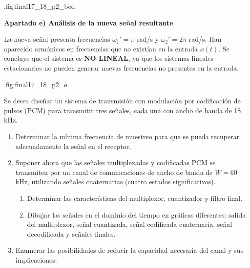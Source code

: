 \begin{resolucion}
%
         {.}{fig:final17_18_p2_bcd}

\textbf{Apartado e) Análisis de la nueva señal resultante}

La nueva señal presenta frecuencias $\omega_1' = \pi$ rad/s y $\omega_2' = 2\pi$ rad/s. Han aparecido armónicos en frecuencias que no existían en la entrada $x(t)$.
Se concluye que el sistema es \textbf{NO LINEAL}, ya que los sistemas lineales estacionarios no pueden generar nuevas frecuencias no presentes en la entrada.

%
         {.}{fig:final17_18_p2_e}

\end{resolucion}

\newpage
\begin{problema}
Se desea diseñar un sistema de transmisión con modulación por codificación de pulsos (PCM) para transmitir tres señales, cada una con ancho de banda de 18 kHz.
\begin{enumerate}[label=\alph*)]
    \item Determinar la mínima frecuencia de muestreo para que se pueda recuperar adecuadamente la señal en el receptor.
    \item Suponer ahora que las señales multiplexadas y codificadas PCM se transmiten por un canal de comunicaciones de ancho de banda de $W=60$ kHz, utilizando señales cuaternarias (cuatro estados significativos).
    \begin{enumerate}[label=\roman*.]
        \item Determinar las características del multiplexor, cuantizador y filtro final.
        \item Dibujar las señales en el dominio del tiempo en gráficas diferentes: salida del multiplexor, señal cuantizada, señal codificada cuaternaria, señal decodificada y señales finales.
    \end{enumerate}
    \item Enumerar las posibilidades de reducir la capacidad necesaria del canal y sus implicaciones.
\end{enumerate}
\end{problema}

